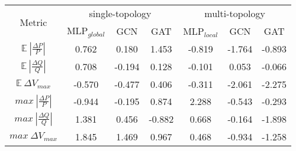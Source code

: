 \makegapedcells\begin{tabular}{|c||c|c|c||c|c|c|}
                   \hline
                   \multirow{2}{*}{Metric} & \multicolumn{3}{c||}{single-topology} & \multicolumn{3}{c|}{multi-topology} \\ \cline{2-7}
                   & MLP$_{global}$ & GCN    & GAT    & MLP$_{local}$ & GCN    & GAT    \\ \hline
                   $\mathbb{E} \ |\frac{\Delta P}{P}|$ & 0.762          & 0.180  & 1.453  & -0.819        & -1.764 & -0.893 \\ \hline
                   $\mathbb{E} \ |\frac{\Delta Q}{Q}|$ & 0.708          & -0.194 & 0.128  & -0.101        & 0.053  & -0.066 \\ \hline
                   $\mathbb{E} \ \Delta V_{max}$       & -0.570         & -0.477 & 0.406  & -0.311        & -2.061 & -2.275 \\ \hline
                   $max \ |\frac{\Delta P}{P}|$        & -0.944         & -0.195 & 0.874  & 2.288         & -0.543 & -0.293 \\ \hline
                   $max \ |\frac{\Delta Q}{Q}|$        & 1.381          & 0.456  & -0.882 & 0.668         & -0.164 & -1.898 \\ \hline
                   $max \ \Delta V_{max}$              & 1.845          & 1.469  & 0.967  & 0.468         & -0.934 & -1.258 \\ \hline

\end{tabular}